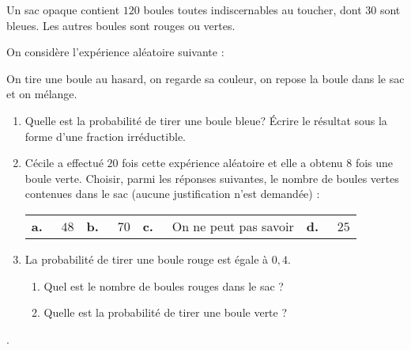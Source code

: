 
Un sac opaque contient $120$ boules toutes indiscernables au toucher, dont 30 sont bleues. Les autres boules sont rouges ou vertes.

On considère l'expérience aléatoire suivante :

On tire une boule au hasard, on regarde sa couleur, on repose la boule dans le sac et on mélange.

\medskip

\begin{enumerate}
\item Quelle est la probabilité de tirer une boule bleue? Écrire le résultat sous la forme d'une fraction irréductible.
\item Cécile a effectué $20$ fois cette expérience aléatoire et elle a obtenu $8$ fois une boule verte. Choisir, parmi les réponses suivantes, le nombre de boules vertes contenues dans le sac (aucune justification n'est demandée) :

\medskip
\begin{tabularx}{\linewidth}{*{4}{X}}
\textbf{a.~~} $48$ &\textbf{b.~~} $70$ &\textbf{c.~~} On ne peut pas savoir &\textbf{d.~~} $25$
\end{tabularx}
\medskip

\item  La probabilité de tirer une boule rouge est égale à $0,4$.
	\begin{enumerate}
		\item Quel est le nombre de boules rouges dans le sac ?
		\item Quelle est la probabilité de tirer une boule verte ?
	\end{enumerate}
\end{enumerate}
.
